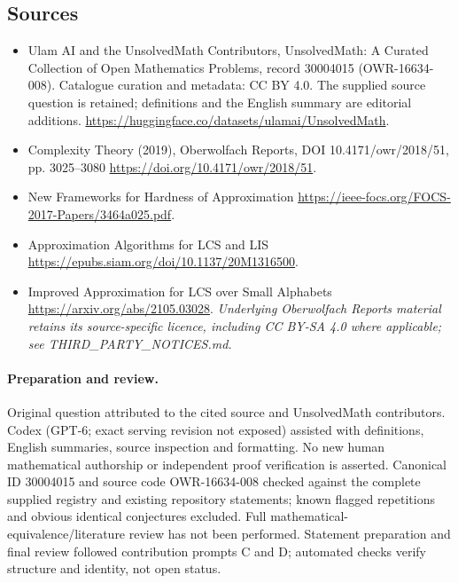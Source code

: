 \documentclass[11pt]{article}
\begin{document}
\subsection{Sources}
\begin{itemize}
\item[\hypertarget{source:30004015:1}{S1}] Ulam AI and the UnsolvedMath Contributors, UnsolvedMath: A Curated Collection of Open Mathematics Problems, record 30004015 (OWR-16634-008). Catalogue curation and metadata: CC BY 4.0. The supplied source question is retained; definitions and the English summary are editorial additions.
\url{https://huggingface.co/datasets/ulamai/UnsolvedMath}.
\item[\hypertarget{source:30004015:2}{S2}] Complexity Theory (2019), Oberwolfach Reports, DOI 10.4171/owr/2018/51, pp. 3025--3080
\url{https://doi.org/10.4171/owr/2018/51}.
\item[\hypertarget{source:30004015:3}{S3}] New Frameworks for Hardness of Approximation
\url{https://ieee-focs.org/FOCS-2017-Papers/3464a025.pdf}.
\item[\hypertarget{source:30004015:4}{S4}] Approximation Algorithms for LCS and LIS
\url{https://epubs.siam.org/doi/10.1137/20M1316500}.
\item[\hypertarget{source:30004015:5}{S5}] Improved Approximation for LCS over Small Alphabets
\url{https://arxiv.org/abs/2105.03028}.
\textit{Underlying Oberwolfach Reports material retains its source-specific licence, including CC BY-SA 4.0 where applicable; see THIRD\_PARTY\_NOTICES.md.}
\end{itemize}
\paragraph{Preparation and review.}
Original question attributed to the cited source and UnsolvedMath contributors. Codex (GPT-6; exact serving revision not exposed) assisted with definitions, English summaries, source inspection and formatting. No new human mathematical authorship or independent proof verification is asserted. Canonical ID 30004015 and source code OWR-16634-008 checked against the complete supplied registry and existing repository statements; known flagged repetitions and obvious identical conjectures excluded. Full mathematical-equivalence/literature review has not been performed. Statement preparation and final review followed contribution prompts C and D; automated checks verify structure and identity, not open status.
\label{end:30004015}
\end{document}
